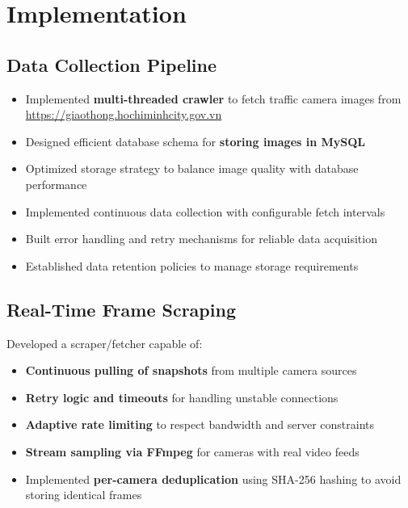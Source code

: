 \section{Implementation}
\subsection{Data Collection Pipeline}

\begin{itemize}
    \item Implemented \textbf{multi-threaded crawler} to fetch traffic camera images from \url{https://giaothong.hochiminhcity.gov.vn}
    \item Designed efficient database schema for \textbf{storing images in MySQL}
    \item Optimized storage strategy to balance image quality with database performance
    \item Implemented continuous data collection with configurable fetch intervals
    \item Built error handling and retry mechanisms for reliable data acquisition
    \item Established data retention policies to manage storage requirements
\end{itemize}



\subsection{Real-Time Frame Scraping}

Developed a scraper/fetcher capable of:

\begin{itemize}
    \item \textbf{Continuous pulling of snapshots} from multiple camera sources
    \item \textbf{Retry logic and timeouts} for handling unstable connections
    \item \textbf{Adaptive rate limiting} to respect bandwidth and server constraints
    \item \textbf{Stream sampling via FFmpeg} for cameras with real video feeds
    \item Implemented \textbf{per-camera deduplication} using SHA-256 hashing to avoid storing identical frames
\end{itemize}

